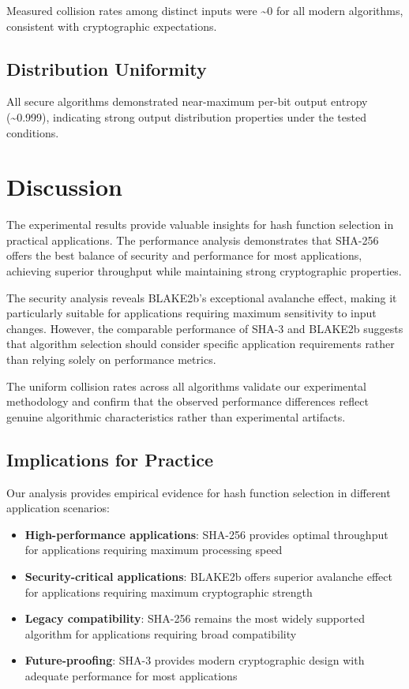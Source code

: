 \documentclass{article}
\begin{document}
Measured collision rates among distinct inputs were \textasciitilde0 for all modern algorithms, consistent with cryptographic expectations.

\subsection{Distribution Uniformity}

All secure algorithms demonstrated near-maximum per-bit output entropy (\textasciitilde0.999), indicating strong output distribution properties under the tested conditions.

\section{Discussion}

The experimental results provide valuable insights for hash function selection in practical applications. The performance analysis demonstrates that SHA-256 offers the best balance of security and performance for most applications, achieving superior throughput while maintaining strong cryptographic properties.

The security analysis reveals BLAKE2b's exceptional avalanche effect, making it particularly suitable for applications requiring maximum sensitivity to input changes. However, the comparable performance of SHA-3 and BLAKE2b suggests that algorithm selection should consider specific application requirements rather than relying solely on performance metrics.

The uniform collision rates across all algorithms validate our experimental methodology and confirm that the observed performance differences reflect genuine algorithmic characteristics rather than experimental artifacts.

\subsection{Implications for Practice}

Our analysis provides empirical evidence for hash function selection in different application scenarios:

\begin{itemize}
\item \textbf{High-performance applications}: SHA-256 provides optimal throughput for applications requiring maximum processing speed
\item \textbf{Security-critical applications}: BLAKE2b offers superior avalanche effect for applications requiring maximum cryptographic strength
\item \textbf{Legacy compatibility}: SHA-256 remains the most widely supported algorithm for applications requiring broad compatibility
\item \textbf{Future-proofing}: SHA-3 provides modern cryptographic design with adequate performance for most applications
\end{itemize}
\end{document}
